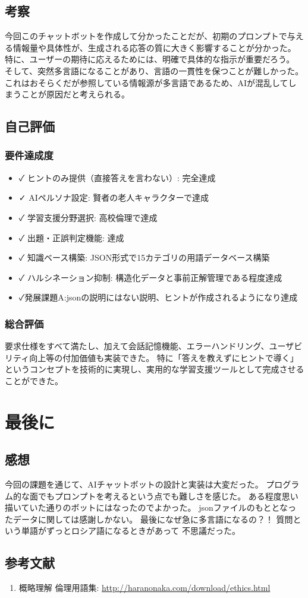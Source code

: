 \documentclass[a4paper,11pt]{ltjsarticle}
\begin{document}
\subsection{考察}
今回このチャットボットを作成して分かったことだが、初期のプロンプトで与える情報量や具体性が、生成される応答の質に大きく影響することが分かった。
特に、ユーザーの期待に応えるためには、明確で具体的な指示が重要だろう。
そして、突然多言語になることがあり、言語の一貫性を保つことが難しかった。
これはおそらくだが参照している情報源が多言語であるため、AIが混乱してしまうことが原因だと考えられる。


\subsection{自己評価}
\subsubsection{要件達成度}
\begin{itemize}
\item ✓ ヒントのみ提供（直接答えを言わない）: 完全達成
\item ✓ AIペルソナ設定: 賢者の老人キャラクターで達成
\item ✓ 学習支援分野選択: 高校倫理で達成
\item ✓ 出題・正誤判定機能: 達成
\item ✓ 知識ベース構築: JSON形式で15カテゴリの用語データベース構築
\item ✓ ハルシネーション抑制: 構造化データと事前正解管理である程度達成
\item ✓発展課題A:jsonの説明にはない説明、ヒントが作成されるようになり達成
\end{itemize}

\subsubsection{総合評価}
要求仕様をすべて満たし、加えて会話記憶機能、エラーハンドリング、ユーザビリティ向上等の付加価値も実装できた。
特に「答えを教えずにヒントで導く」というコンセプトを技術的に実現し、実用的な学習支援ツールとして完成させることができた。


\section{最後に}
\subsection{感想}
今回の課題を通じて、AIチャットボットの設計と実装は大変だった。
プログラム的な面でもプロンプトを考えるという点でも難しさを感じた。
ある程度思い描いていた通りのボットにはなったのでよかった。
jsonファイルのもととなったデータに関しては感謝しかない。
最後になぜ急に多言語になるの？！
質問という単語がずっとロシア語になるときがあって
不思議だった。
\subsection{参考文献}
\begin{enumerate}
\item 概略理解 倫理用語集: \url{http://haranonaka.com/download/ethics.html}
\end{enumerate}
\end{document}
